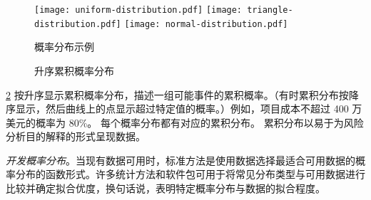 \begin{figure}
  \texttt{[image: uniform-distribution.pdf]}\hfill
  \texttt{[image: triangle-distribution.pdf]}\hfill
  \texttt{[image: normal-distribution.pdf]}
  \caption{概率分布示例}
  \label{fig:example-probability-distributions}
\end{figure}

\begin{figure}
  \caption{升序累积概率分布}
  \label{fig:cumulative-probability-distributions}
\end{figure}

\cref{fig:cumulative-probability-distributions} 按升序显示累积概率分布，描述一组可能事件的累积概率。（有时累积分布按降序显示，然后曲线上的点显示超过特定值的概率。）例如，项目成本不超过 400 万美元的概率为 80\%。 每个概率分布都有对应的累积分布。 累积分布以易于为风险分析目的解释的形式呈现数据。

\emph{开发概率分布}。当现有数据可用时，标准方法是使用数据选择最适合可用数据的概率分布的函数形式。许多统计方法和软件包可用于将常见分布类型与可用数据进行比较并确定拟合优度，换句话说，表明特定概率分布与数据的拟合程度。

